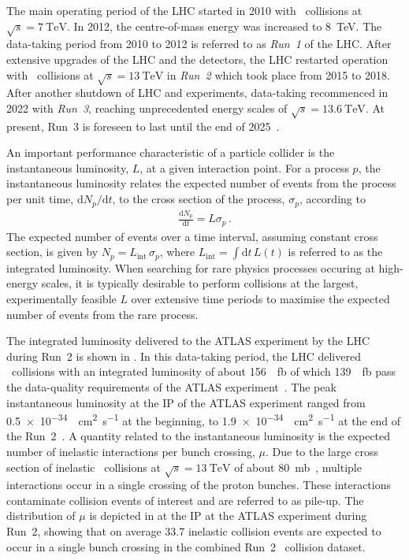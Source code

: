The main operating period of the LHC started in 2010 with \pp~collisions at
$\sqrt{s} = \SI{7}{\TeV}$. In 2012, the centre-of-mass energy was increased to
\SI{8}{\TeV}. The data-taking period from 2010 to 2012 is referred to as
\emph{Run~1} of the LHC. After extensive upgrades of the LHC and the detectors,
the LHC restarted operation with \pp~collisions at $\sqrt{s} = \SI{13}{\TeV}$ in
\emph{Run~2} which took place from 2015 to 2018. After another shutdown of LHC
and experiments, data-taking recommenced in 2022 with \emph{Run~3}, reaching
unprecedented energy scales of $\sqrt{s} = \SI{13.6}{\TeV}$. At present, Run~3
is foreseen to last until the end of 2025~\cite{lhc_schedule}.

An important performance characteristic of a particle collider is the
instantaneous luminosity, $L$, at a given interaction point. For a process $p$,
the instantaneous luminosity relates the expected number of events from the
process per unit time, $\mathrm{d}N_{p} / \mathrm{d}t$, to the cross section of
the process, $\sigma_{p}$, according to
\begin{align*}
  \frac{\mathrm{d}N_{p}}{\mathrm{d}t} = L \sigma_{p} \,\text{.}
\end{align*}
The expected number of events over a time interval, assuming constant
cross section, is given by $N_{p} = L_{\text{int}} \, \sigma_{p}$, where
$L_{\text{int}} = \int \mathrm{d}t \, L(t)$ is referred to as the integrated
luminosity. When searching for rare physics processes occuring at high-energy
scales, it is typically desirable to perform collisions at the largest,
experimentally feasible $L$ over extensive time periods to maximise the expected
number of events from the rare process.

The integrated luminosity delivered to the ATLAS experiment by the LHC during
Run~2 is shown in . In this data-taking period,
the LHC delivered \pp~collisions with an integrated luminosity of about
\SI{156}{\per\femto\barn} of which \SI{139}{\per\femto\barn} pass the
data-quality requirements of the ATLAS experiment~\cite{ATLAS-CONF-2019-021}.
The peak instantaneous luminosity at the IP of the ATLAS experiment ranged from
\SI{0.5e-34}{\per\centi\metre\squared\per\second} at the beginning, to
\SI{1.9e-34}{\per\centi\metre\squared\per\second} at the end of the
Run~2~\cite{ATLAS-CONF-2019-021}. A quantity related to the instantaneous
luminosity is the expected number of inelastic \pp interactions per bunch
crossing, $\mu$. Due to the large cross section of inelastic \pp~collisions at
$\sqrt{s} = \SI{13}{\TeV}$ of about \SI{80}{\milli\barn}~\cite{STDM-2015-05},
multiple interactions occur in a single crossing of the proton bunches. These
interactions contaminate collision events of interest and are referred to as
pile-up. The distribution of $\mu$ is depicted in  at the IP
at the ATLAS experiment during Run~2, showing that on average \num{33.7}
inelastic collision events are expected to occur in a single bunch crossing in
the combined Run~2 \pp~collision dataset.

